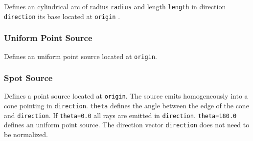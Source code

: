 \documentclass[10pt,a4paper,titlepage]{article}
\begin{document}








\vspace{0.25cm}
Defines an cylindrical arc of radius {\tt radius} and length {\tt length} in direction {\tt direction} its base located at {\tt origin} .

\subsubsection{Uniform Point Source}






\vspace{0.25cm}
Defines an uniform point source located at {\tt origin}. 


\subsubsection{Spot Source}








\vspace{0.25cm}
Defines a point source located at {\tt origin}. The source emits homogeneously into a cone pointing in {\tt direction}. {\tt theta} defines the angle between the edge of the cone and {\tt direction}. If {\tt theta=0.0} all rays are emitted in {\tt direction}. {\tt theta=180.0} defines an uniform point source. The direction vector {\tt direction} does not need to be normalized.
\end{document}
